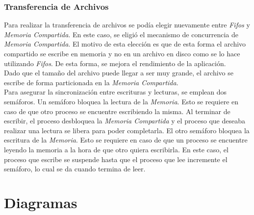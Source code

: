 \documentclass[a4paper,10pt]{article}
\begin{document}
			\subsubsection{Transferencia de Archivos}
			Para realizar la transferencia de archivos se pod\'ia elegir nuevamente entre \emph{Fifos} y \emph{Memoria Compartida}. En este caso,
			se eligi\'o el mecanismo de concurrencia de \emph{Memoria Compartida}. El motivo de esta elecci\'on es que de esta forma el archivo
			compartido se escribe en memoria y no en un archivo en disco como se lo hace utilizando \emph{Fifos}. De esta forma, se mejora el 
			rendimiento de la aplicaci\'on. \\
			\indent Dado que el tama\~no del archivo puede llegar a ser muy grande, el archivo se escribe de forma particionada en la 
			\emph{Memoria Compartida}. \\
			\indent Para asegurar la sincronizaci\'on entre escrituras y lecturas, se emplean dos sem\'aforos. Un sem\'aforo bloquea 
			la lectura de la \emph{Memoria}. Esto se requiere en caso de que otro proceso se encuentre escribiendo la misma. Al terminar
			de escribir, el proceso desbloquea la \emph{Memoria Compartida} y el proceso que deseaba realizar una lectura se libera para
			poder completarla. El otro sem\'aforo bloquea la escritura de la \emph{Memoria}. Esto se requiere en caso de que un proceso
			se encuentre leyendo la memoria a la hora de que otro quiera escribirla. En este caso, el proceso que escribe se suspende 
			hasta que el proceso que lee incremente el sem\'aforo, lo cual se da cuando termina de leer.
			

	\section{Diagramas}
		
\end{document}

